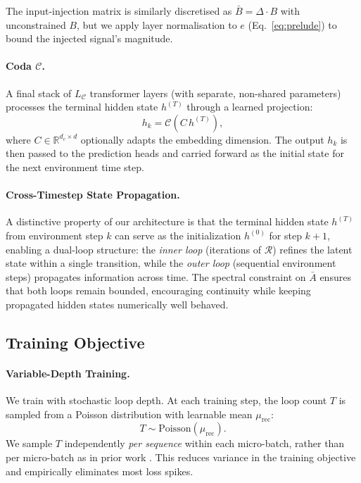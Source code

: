 The input-injection matrix is similarly discretised as $\bar{B} = \Delta \cdot B$ with unconstrained $B$, but we apply layer normalisation to $e$ (Eq.~\ref{eq:prelude}) to bound the injected signal's magnitude.

\paragraph{Coda $\mathcal{C}$.} A final stack of $L_\mathcal{C}$ transformer layers (with separate, non-shared parameters) processes the terminal hidden state $h^{(T)}$ through a learned projection:
\begin{equation}
  h_k = \mathcal{C}(C\, h^{(T)}),
  \label{eq:coda}
\end{equation}
where $C \in \mathbb{R}^{d_c \times d}$ optionally adapts the embedding dimension. The output $h_k$ is then passed to the prediction heads and carried forward as the initial state for the next environment time step.

\paragraph{Cross-Timestep State Propagation.} A distinctive property of our architecture is that the terminal hidden state $h^{(T)}$ from environment step $k$ can serve as the initialization $h^{(0)}$ for step $k{+}1$, enabling a dual-loop structure: the \emph{inner loop} (iterations of $\mathcal{R}$) refines the latent state within a single transition, while the \emph{outer loop} (sequential environment steps) propagates information across time. The spectral constraint on $\bar{A}$ ensures that both loops remain bounded, encouraging continuity while keeping propagated hidden states numerically well behaved.

\subsection{Training Objective}
\label{sec:training}

\paragraph{Variable-Depth Training.} We train with stochastic loop depth. At each training step, the loop count $T$ is sampled from a Poisson distribution with learnable mean $\mu_{\mathrm{rec}}$:
\begin{equation}
  T \sim \mathrm{Poisson}(\mu_{\mathrm{rec}}).
  \label{eq:depth_sampling}
\end{equation}
We sample $T$ independently \emph{per sequence} within each micro-batch, rather than per micro-batch as in prior work \citep{geiping2025rdm}. This reduces variance in the training objective and empirically eliminates most loss spikes.

